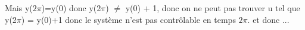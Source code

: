 \documentclass{article}
\begin{document}
    
    Mais y($2\pi$)=y(0) donc y(2$\pi$) $\neq$ y(0) + 1, donc on ne peut pas trouver u tel que y(2$\pi$) = y(0)+1 donc le système n'est pas contrôlable en temps $2\pi$.
    et donc ...
\end{document}
